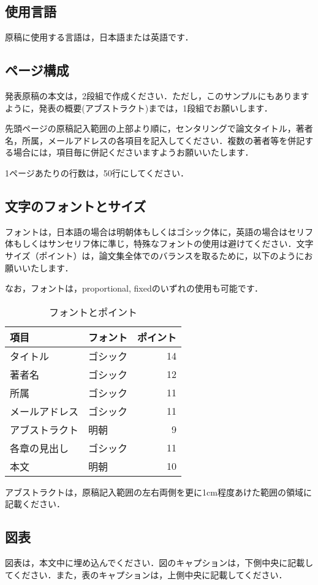 \documentclass[dvipdfmx]{jaeis-national-convention}
\begin{document}
\subsection{使用言語}
原稿に使用する言語は，日本語または英語です．

\subsection{ページ構成}
発表原稿の本文は，2段組で作成ください．ただし，このサンプルにもありますように，発表の概要(アブストラクト)までは，1段組でお願いします．

先頭ページの原稿記入範囲の上部より順に，センタリングで論文タイトル，著者名，所属，メールアドレスの各項目を記入してください．複数の著者等を併記する場合には，項目毎に併記くださいますようお願いいたします．

1ページあたりの行数は，50行にしてください．

\subsection{文字のフォントとサイズ}
フォントは，日本語の場合は明朝体もしくはゴシック体に，英語の場合はセリフ体もしくはサンセリフ体に準じ，特殊なフォントの使用は避けてください．文字サイズ（ポイント）は，論文集全体でのバランスを取るために，以下のようにお願いいたします．

なお，フォントは，proportional, fixedのいずれの使用も可能です．

\begin{table}[htb]
	\caption{フォントとポイント}
	\begin{tabularx}{\columnwidth}{llr}
		\hline
		\textbf{項目} & \textbf{フォント} & \textbf{ポイント} \\ \hline
		タイトル & ゴシック & 14 \\
		著者名 & ゴシック & 12 \\
		所属 & ゴシック & 11 \\
		メールアドレス & ゴシック& 11 \\
		アブストラクト & 明朝 & 9 \\
		各章の見出し & ゴシック & 11 \\
		本文 & 明朝 & 10 \\
		\hline
	\end{tabularx}
\end{table}

アブストラクトは，原稿記入範囲の左右両側を更に1cm程度あけた範囲の領域に記載ください．

\subsection{図表}
図表は，本文中に埋め込んでください．図のキャプションは，下側中央に記載してください．また，表のキャプションは，上側中央に記載してください．
\end{document}
